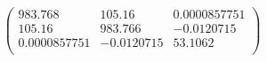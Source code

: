 \documentclass{article}
\begin{document}
\[\left(
\begin{array}{ccc}
 983.768 & 105.16 & 0.0000857751 \\
 105.16 & 983.766 & -0.0120715 \\
 0.0000857751 & -0.0120715 & 53.1062 \\
\end{array}
\right)\]
\end{document}
